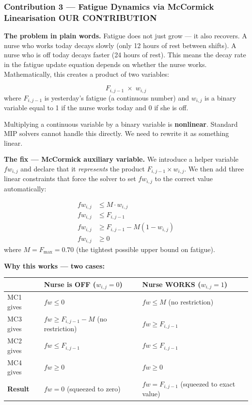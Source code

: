 \documentclass[12pt,a4paper]{article}
\newcommand{\contribbadge}{\colorbox{accentred}{\tiny\color{white}\textbf{OUR CONTRIBUTION}}\,}
\begin{document}
\subsubsection{Contribution 3 — Fatigue Dynamics via McCormick Linearisation \contribbadge}

\textbf{The problem in plain words.} Fatigue does not just grow — it also recovers. A nurse who works today decays slowly (only 12 hours of rest between shifts). A nurse who is off today decays faster (24 hours of rest). This means the decay rate in the fatigue update equation depends on whether the nurse works. Mathematically, this creates a product of two variables:

\begin{eqbox}
\[
  F_{i,j-1} \;\times\; w_{i,j}
\]
where $F_{i,j-1}$ is yesterday's fatigue (a continuous number) and $w_{i,j}$ is a binary variable equal to 1 if the nurse works today and 0 if she is off.
\end{eqbox}

Multiplying a continuous variable by a binary variable is \textbf{nonlinear}. Standard MIP solvers cannot handle this directly. We need to rewrite it as something linear.

\vspace{6pt}
\textbf{The fix — McCormick auxiliary variable.} We introduce a helper variable $fw_{i,j}$ and declare that it \emph{represents} the product $F_{i,j-1} \times w_{i,j}$. We then add three linear constraints that force the solver to set $fw_{i,j}$ to the correct value automatically:

\begin{eqbox}
\begin{align}
  fw_{i,j} &\leq M \cdot w_{i,j} \tag{MC1}\\
  fw_{i,j} &\leq F_{i,j-1} \tag{MC2}\\
  fw_{i,j} &\geq F_{i,j-1} - M(1 - w_{i,j}) \tag{MC3}\\
  fw_{i,j} &\geq 0 \tag{MC4}
\end{align}
where $M = F_{\max} = 0.70$ (the tightest possible upper bound on fatigue).
\end{eqbox}

\textbf{Why this works — two cases:}

\begin{center}
\begin{tabularx}{\textwidth}{@{}lXX@{}}
  \toprule
  & \textbf{Nurse is OFF} ($w_{i,j}=0$) & \textbf{Nurse WORKS} ($w_{i,j}=1$)\\
  \midrule
  MC1 gives & $fw \leq 0$ & $fw \leq M$ (no restriction)\\
  MC3 gives & $fw \geq F_{i,j-1} - M$ (no restriction) & $fw \geq F_{i,j-1}$\\
  MC2 gives & $fw \leq F_{i,j-1}$ & $fw \leq F_{i,j-1}$\\
  MC4 gives & $fw \geq 0$ & $fw \geq 0$\\
  \midrule
  \textbf{Result} & $fw = 0$ \quad (squeezed to zero) & $fw = F_{i,j-1}$ \quad (squeezed to exact value)\\
  \bottomrule
\end{tabularx}
\end{center}
\end{document}

